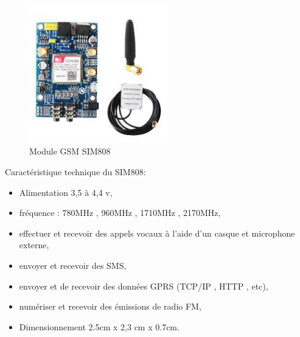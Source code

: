 \begin{figure}[H]
	\centering
	\includegraphics[width=6cm]{./img/gsmSim808.jpeg}
	\caption{Module GSM SIM808 }
	\label{i1}
\end{figure}

Caractéristique technique du SIM808: 
\begin{itemize}
	\item Alimentation 3,5 à 4,4 v,
	\item fréquence : 780MHz , 960MHz , 1710MHz , 2170MHz,
	\item effectuer et recevoir des appels vocaux à l'aide d'un casque et microphone externe,
	\item envoyer et recevoir des SMS,
	\item envoyer et de recevoir des données GPRS (TCP/IP , HTTP , etc),
	\item numériser et recevoir des émissions de radio FM,
	\item Dimensionnement 2.5cm x 2,3 cm x 0.7cm.
\end{itemize}


 

